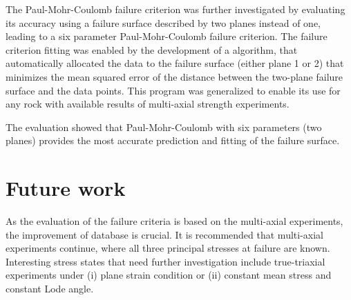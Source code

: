 The Paul-Mohr-Coulomb failure criterion was further investigated by evaluating its accuracy using a failure surface described by two planes instead of one, leading to a six parameter Paul-Mohr-Coulomb failure criterion. The failure criterion fitting was enabled by the development of a algorithm, that automatically allocated the data to the failure surface (either plane 1 or 2) that minimizes the mean squared error of the distance between the two-plane failure surface and the data points. This program was generalized to enable its use for any rock with available results of multi-axial strength experiments. 

The evaluation showed that Paul-Mohr-Coulomb with six parameters (two planes) provides the most accurate prediction and fitting of the failure surface.

\section{Future work}

As the evaluation of the failure criteria is based on the multi-axial experiments, the improvement of database is crucial. It is recommended that multi-axial experiments continue, where all three principal stresses at failure are known. Interesting stress states that need further investigation include true-triaxial experiments under (i) plane strain condition or (ii) constant mean stress and constant Lode angle. 